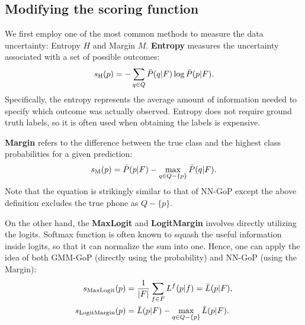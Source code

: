\subsection{Modifying the scoring function}\label{subsec:modify_score}
We first employ one of the most common methods to measure the data uncertainty: Entropy $H$ and Margin $M$.
\textbf{Entropy} measures the uncertainty associated with a set of possible outcomes:
\begin{align}
    s_\text{H}(p) = -\sum_{q \in Q} \Bar{P}(q|F) \log \Bar{P}(p|F).
\label{eq:entropy-gop}
\end{align} 
Specifically, the entropy represents the average amount of information needed to specify which outcome was actually observed.
Entropy does not require ground truth labels, so it is often used when obtaining the labels is expensive.


\textbf{Margin} refers to the difference between the true class and the highest class probabilities for a given prediction:
\begin{align}
    s_\text{M}(p) = \Bar{P}(p|F) - \max_{q \in Q - \{p\}} \Bar{P}(q|F).
\label{eq:margin-gop}
\end{align}
Note that the equation is strikingly similar to that of NN-GoP except the above definition excludes the true phone as $Q - \{p\}$.


On the other hand, the \textbf{MaxLogit} \cite{hendrycks2022scaling} and \textbf{LogitMargin} involves directly utilizing the logits.
Softmax function is often known to squash the useful information inside logits, so that it can normalize the sum into one.
Hence, one can apply the idea of both GMM-GoP (directly using the probability) and NN-GoP (using the Margin):
\begin{align}
    s_\text{MaxLogit}(p) &= \frac{1}{|F|} \sum_{f \in F} L^f(p|f) = \Bar{L}(p|F), \\
    s_\text{LogitMargin}(p) &= \Bar{L}(p|F) - \max_{q \in Q - \{p\}} \Bar{L}(p|F).
\label{eq:logit-gop}
\end{align} 


